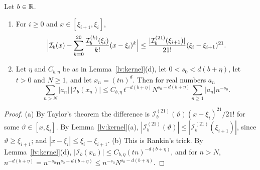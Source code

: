\begin{lemma}\label{lv:remainders}
Let $b\in\mathbb R$.
\begin{enumerate}
\item[(a)] For $i\ge0$ and $x\in[\xi_{i+1},\xi_i]$,
 \[
  \Bigl|\mathcal I_b(x)-\sum_{k=0}^{20}\frac{\mathcal I_b^{(k)}(\xi_i)}{k!}
  (x-\xi_i)^k\Bigr|\le\frac{|\mathcal I_b^{(21)}(\xi_{i+1})|}{21!}
  (\xi_i-\xi_{i+1})^{21}.
 \]
\item[(b)] Let $\eta$ and $C_{b,\eta}$ be as in Lemma~\ref{lv:kernel}(d), let
 $0<s_0<d(b+\eta)$, let $t>0$ and $N\ge1$, and let $x_n=(tn)^d$. Then for
 real numbers $a_n$
 \[
  \sum_{n>N}|a_n|\,|\mathcal I_b(x_n)|\le C_{b,\eta}\,t^{-d(b+\eta)}
  N^{s_0-d(b+\eta)}\sum_{n\ge1}|a_n|n^{-s_0}.
 \]
\end{enumerate}
\end{lemma}

\begin{proof}
(a) By Taylor's theorem the difference is
$\mathcal I_b^{(21)}(\vartheta)(x-\xi_i)^{21}/21!$ for some $\vartheta\in[x,\xi_i]$. By
Lemma~\ref{lv:kernel}(a), $|\mathcal I_b^{(21)}(\vartheta)|\le|\mathcal
I_b^{(21)}(\xi_{i+1})|$, since $\vartheta\ge \xi_{i+1}$; and $|x-\xi_i|\le \xi_i-\xi_{i+1}$.
(b) This is Rankin's trick. By Lemma~\ref{lv:kernel}(d),
$|\mathcal I_b(x_n)|\le C_{b,\eta}(tn)^{-d(b+\eta)}$, and for $n>N$,
$n^{-d(b+\eta)}=n^{-s_0}n^{s_0-d(b+\eta)}\le n^{-s_0}N^{s_0-d(b+\eta)}$.
\end{proof}

